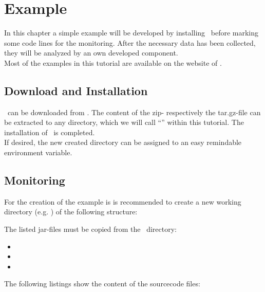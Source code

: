 \chapter{Example}
	In this chapter a simple example will be developed by installing \Kieker\ before marking some code lines for the monitoring. After the necessary data has been collected, they will be analyzed by an own developed component.\\
	\notify Most of the examples in this tutorial are available on the website of \Kieker.

	\section{Download and Installation}
		\Kieker\  can be downloaded from \KiekerURL. The content of the zip- respectively the tar.gz-file can be extracted to any directory, which we will call ``\KiekerDir'' within this tutorial. The installation of \Kieker\ is completed.\\
		If desired, the new created directory can be assigned to an easy remindable environment variable.


	\section{Monitoring}
		For the creation of the example is is recommended to create a new working directory (e.g. ) of the following structure:

		The listed jar-files must be copied from the \Kieker\  directory:
		\begin{itemize}
			\item {}
			\item {}
			\item {}
		\end{itemize}
		The following listings show the content of the sourcecode files:
		\setJavaCodeListing       
		
		
		

